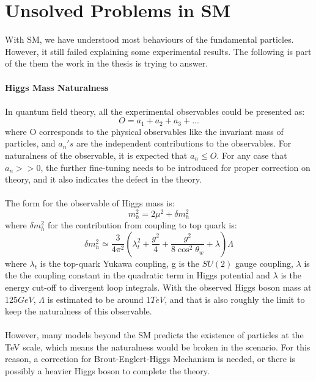\section{Unsolved Problems in SM}
With SM, we have understood most behaviours of the fundamental particles. However, it still failed explaining some experimental results. The following is part of the them the work in the thesis is trying to answer.
\\
\\{\bf Higgs Mass Naturalness}
\\
\\In quantum field theory, all the experimental observables could be presented as:
\begin{equation}
O=a_1+a_2+a_3+...
\end{equation}
where O corresponds to the physical observables like the invariant mass of particles, and $a_n's$ are the independent contributions to the observables. For naturalness of the observable, it is expected that $a_n\leq O$. For any case that $a_n>>0$, the further fine-tuning needs to be introduced for proper correction on theory, and it also indicates the defect in the theory. \\
\\The form for the observable of Higgs mass is:
\begin{equation}
m_h^2=2\mu^2+\delta m_h^2
\end{equation}
where $\delta m_h^2$ for the contribution from coupling to top quark is:
\begin{equation}
\delta m_h^2 \simeq \frac{3}{4\pi^2}\left(\lambda^2_t+\frac{g^2}{4}+\frac{g^2}{8\cos^2{\theta_w}}+\lambda\right)\Lambda
\end{equation}
where $\lambda_t$ is the top-quark Yukawa coupling, g is the $SU\left(2\right)$ gauge coupling, $\lambda$ is the the coupling constant in the quadratic term in Higgs potential and $\lambda$ is the energy cut-off to divergent loop integrals. With the observed Higgs boson mass at 125$GeV$, $\Lambda$ is estimated to be around 1$TeV$, and that is also roughly the limit to keep the naturalness of this observable. 
\\
\\However, many models beyond the SM predicts the existence of particles at the TeV scale, which means the naturalness would be broken in the scenario. For this reason, a correction for Brout-Englert-Higgs Mechanism is needed, or there is possibly a heavier Higgs boson to complete the theory.  
\\
